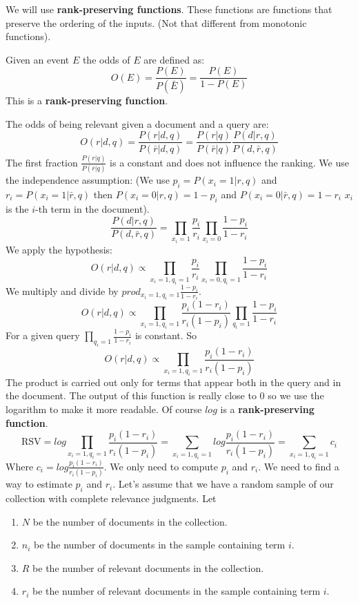 We will use \textbf{rank-preserving functions}. These functions
are functions that preserve the ordering of the inputs.
(Not that different from monotonic functions).

Given an event $E$ the odds of $E$ are defined as:
\[
    O(E) = \frac{P(E)}{P(\bar{E})} = \frac{P(E)}{1-P(E)}
\]
This is a \textbf{rank-preserving function}.

The odds of being relevant given a document and a query are:
\[
    O(r|d,q) = \frac{P(r|d,q)}{P(\bar{r}|d,q)} = 
        \frac{P(r|q)}{P(\bar{r}|q)}\frac{P(d|r,q)}{P(d,\bar{r},q)}
\]
The first fraction $\frac{P(r|q)}{P(\bar{r}|q)}$ is a constant and 
does not influence the ranking.
We use the independence assumption:
(We use $p_i=P(x_i=1|r,q)$ and $r_i=P(x_i=1|\bar{r},q)$ 
then $P(x_i=0|r,q)=1-p_i$ and $P(x_i=0|\bar{r},q)=1-r_i$
$x_i$ is the $i$-th term in the document).
\[
    \frac{P(d|r,q)}{P(d,\bar{r},q)} =
        \prod_{x_i=1}\frac{p_i}{r_i}\prod_{x_i=0}\frac{1-p_i}{1-r_i}
\]
We apply the hypothesis:
\[
    O(r|d,q)\propto\prod_{x_i=1,q_i=1}\frac{p_i}{r_i}
        \prod_{x_i=0,q_i=1}\frac{1-p_i}{1-r_i}
\]
We multiply and divide by $prod_{x_i=1,q_i=1}\frac{1-p_i}{1-r_i}$.
\[
    O(r|d,q)\propto\prod_{x_i=1,q_i=1}\frac{p_i(1-r_i)}{r_i(1-p_i)}
        \prod_{q_i=1}\frac{1-p_i}{1-r_i}
\]
For a given query $\prod_{q_i=1}\frac{1-p_i}{1-r_i}$ is constant.
So
\[
    O(r|d,q)\propto\prod_{x_i=1,q_i=1}\frac{p_i(1-r_i)}{r_i(1-p_i)}
\]
The product is carried out only for terms that appear both in the query
and in the document.
The output of this function is really close to 0 so we use the
logarithm to make it more readable.
Of course $log$ is a \textbf{rank-preserving function}.
\[
    \text{RSV}=log\prod_{x_i=1,q_i=1}\frac{p_i(1-r_i)}{r_i(1-p_i)} =
        \sum_{x_i=1,q_i=1}log\frac{p_i(1-r_i)}{r_i(1-p_i)} =
        \sum_{x_i=1,q_i=1} c_i
\]
Where $c_i=log\frac{p_i(1-r_i)}{r_i(1-p_i)}$.
We only need to compute $p_i$ and $r_i$.
We need to find a way to estimate $p_i$ and $r_i$.
Let's assume that we have a random sample of our collection with complete
relevance judgments.
Let
\begin{enumerate}
    \item $N$ be the number of documents in the collection.
    \item $n_i$ be the number of documents in the sample containing term $i$.
    \item $R$ be the number of relevant documents in the collection.
    \item $r_i$ be the number of relevant documents in the sample containing term $i$.
\end{enumerate}


